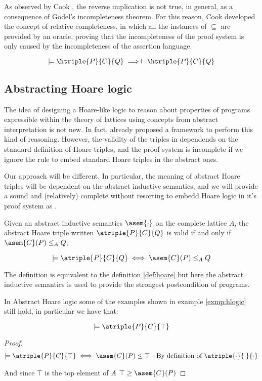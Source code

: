 As observed by Cook \cite{Cook78}, the reverse implication is not true, in 
general, as a consequence of Gödel's incompleteness theorem. For this reason, 
Cook developed the concept of relative completeness, in which all the instances 
of $\subseteq$ are provided by an oracle, proving that the incompleteness of the 
proof system is only caused by the incompleteness of the assertion language.

\begin{theorem}
  \label{thm:hlogic-complete}
  $$\models \htriple{P}{C}{Q} \implies \vdash \htriple{P}{C}{Q}$$
\end{theorem}

\subsection{Abstracting Hoare logic}
The idea of designing a Hoare-like logic to reason about properties of programs
expressible within the theory of lattices using concepts from abstract
interpretation is not new. In fact, \cite{Cousot12} already proposed a
framework to perform this kind of reasoning. However, the validity of the
triples in \cite{Cousot12} dependends on the standard definition of Hoare
triples, and the proof system is incomplete if we ignore the rule to embed
standard Hoare triples in the abstract ones.

Our approach will be different. In particular, the meaning of abstract Hoare 
triples will be dependent on the abstract inductive semantics, and we will 
provide a sound and (relatively) complete without resorting to embedd Hoare 
logic in it's proof system as \cite{Cousot12}.

\begin{definition}
  \label{def:aht}
  Given an abstract inductive semantics $\asem{\cdot}$ on the complete lattice
  $A$, the abstract Hoare triple written $\atriple{P}{C}{Q}$ is valid if
  and only if $\asem{C}(P) \leq_A Q$.

  $$\models \atriple{P}{C}{Q} \iff \asem{C}(P) \leq_A Q$$
\end{definition}

The definition is equivalent to the definition \ref{def:hoare} 
but here the abstract inductive semantics is used to provide the strongest 
postcondition of programs.

In Abstract Hoare logic some of the examples shown in example \ref{exmp:hlogic} 
still hold, in particular we have that:
\begin{example}
  $$\models \atriple{P}{C}{\top}$$
\end{example}
\begin{proof}
  \begin{align*}
    \models \atriple{P}{C}{\top}
      & \iff \asem{C}(P) \leq \top & \text{By definition of $\atriple{\cdot}{\cdot}{\cdot}$} \\
  \end{align*}

  And since $\top$ is the top element of $A$ $\top \geq \asem{C}(P)$
\end{proof}

